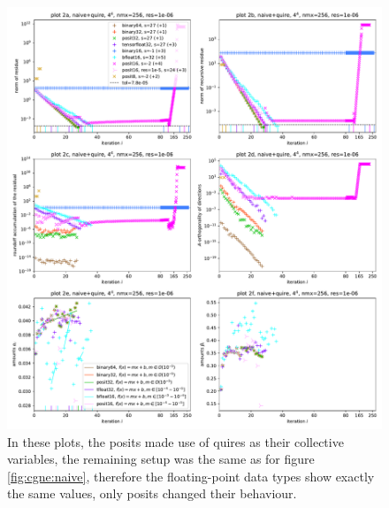 \documentclass{article}
\theoremstyle{plain} %
\theoremstyle{convention} %
\theoremstyle{remark} %
\numberwithin{equation}{section}
\begin{document}
\begin{figure}
    \centering
    \includegraphics[width=1.0\textwidth]{plots/cgne_final_1}
    \caption{In these plots, the posits made use of \glspl{quire} as their collective variables, the remaining setup was the same as for figure \ref{fig:cgne:naive}, therefore the floating-point data types show exactly the same values, only posits changed their behaviour.}
    \label{fig:cgne:quire}
\end{figure}
\end{document}
